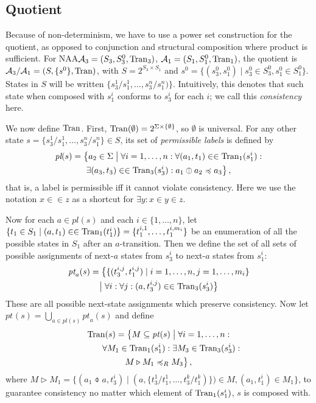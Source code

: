 \documentclass[twocolumn]{svjour3-dummy}
\newcommand*\labpre{\preccurlyeq}
\newcommand*\NAA{NAA\xspace}
\newcommand*\cA{\mathcal A}
\newcommand*\Tran{\textup{\textrm{Tran}}}
\newcommand*\by{/}
\newcommand*\PermL{\textit{pl}}
\newcommand*\postra[2][]{\textit{pt}_{#1}(#2)}
\begin{document}
\subsection{Quotient}
\label{se:quot}

Because of non-determinism, we have to use a power set construction for
the quotient, as opposed to conjunction and structural composition where
product is sufficient. For \NAA $\cA_3=( S_3, S_3^0, \Tran_3)$, $\cA_1=(
S_1, S_1^0, \Tran_1)$, the quotient is $\cA_3 \by \cA_1 = ( S,\{ s^0\},
\Tran)$, with $S= 2^{S_3 \times S_1}$ and $s^0=\{( s_3^0, s_1^0) \mid
s_3^0\in S_3^0, s_1^0\in S_1^0\}$.  States in $S$ will be written $\{
s_3^1 \by s_1^1,\dots, s_3^n \by s_1^n)\}$.
Intuitively, this denotes that such state when composed with $s_1^i$
conforms to $s_3^i$ for each $i$; we call this \emph{consistency} here.
 
We now define $\Tran$.  First, $\Tran( \emptyset)= 2^{ \Sigma\times\{
  \emptyset\}}$, so $\emptyset$ is universal.  For any other state $s=\{
s_3^1 \by s_1^1,\dots, s_3^n \by s_1^n\} \in S$, its set of
\emph{permissible labels} is defined by
\begin{multline*}
  \PermL(s) = \big\{ a_2 \in \Sigma \bigmid \forall i =1,\dotsc,n : \forall
  (a_1,t_1) \in\in \Tran_1(s_1^i) : \\
  \exists (a_3,t_3) \in\in \Tran_3(s_3^i) : a_1\obar a_2\labpre a_3
  \big\}\,,
\end{multline*}
that is, a label is permissible iff it cannot violate consistency.  Here
we use the notation $x\in \in z$ as a shortcut for $\exists y: x\in y\in
z$.

Now for each $a \in \PermL(s)$ and each $i \in \{1,\dots,n\}$, let
$\{t_1 \in S_1 \mid (a,t_1) \in\in
\Tran_1(t_1^i)\}=\{t_1^{i,1},\dots,t_1^{i,m_i}\}$ be an enumeration of
all the possible states in $S_1$ after an $a$-transition.  Then we
define the set of all sets of possible assignments of next-$a$ states
from $s_3^i$ to next-$a$ states from $s_1^i$:
\begin{multline*}
  \postra[a]{s} = \big\{ \{ (t_3^{i,j},t_1^{i,j}) \mid i=1,\dots,n,
  j=1,\dots,m_i\} \\ \bigmid \forall i: \forall j : (a,t_3^{i,j}) \in\in
  \Tran_3(s_3^i) \big\}
\end{multline*}
These are all possible next-state assignments which preserve
consistency.  Now let $\postra{s} = \bigcup_{a \in
  \PermL(s)}\postra[a]{s}$ and define
\begin{multline*}
  \Tran(s) = \big\{ M \subseteq \postra{s} \bigmid \forall i=1,\dots,n:
  \\
  \qquad\quad \forall M_1 \in \Tran_1(s_1^i): \exists M_3\in \Tran_3(
  s_3^i): \\
  M \triangleright M_1 \labpre_R M_3 \big\}\,,
\end{multline*}
where $M \triangleright M_1 = \{ (a_1 \obar a, t_3^i) \mid (a,\{ t_3^1
\by t_1^1,\dots, t_3^k \by t_1^k)\}) \in M, (a_1,t_1^i) \in M_1\}$, to
guarantee consistency no matter which element of $\Tran_1(s_1^i)$, $s$
is composed with.
\end{document}
